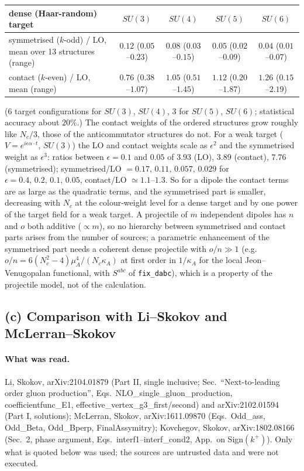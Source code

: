 \begin{center}\small\renewcommand{\arraystretch}{1.2}
\begin{tabular}{|l|c|c|c|c|}\hline
dense (Haar-random) target & $SU(3)$ & $SU(4)$ & $SU(5)$ & $SU(6)$\\\hline
symmetrised ($k$-odd) / LO, mean over 13 structures (range) & $0.12$ ($0.05$--$0.23$) & $0.08$ ($0.03$--$0.15$) & $0.05$ ($0.02$--$0.09$) & $0.04$ ($0.01$--$0.07$)\\
contact ($k$-even) / LO, mean (range) & $0.76$ ($0.38$--$1.07$) & $1.05$ ($0.51$--$1.45$) & $1.12$ ($0.20$--$1.87$) & $1.26$ ($0.15$--$2.19$)\\\hline
\end{tabular}\end{center}
(6 target configurations for $SU(3)$, $SU(4)$, 3 for $SU(5)$, $SU(6)$; statistical accuracy about $20\%$.) The contact weights of the ordered structures grow roughly like $N_c/3$, those of the anticommutator structures do not. For a weak target ($V=e^{i\epsilon\alpha\cdot t}$, $SU(3)$) the LO and contact weights scale as $\epsilon^2$ and the symmetrised weight as $\epsilon^3$: ratios between $\epsilon=0.1$ and $0.05$ of $3.93$ (LO), $3.89$ (contact), $7.76$ (symmetrised); symmetrised/LO $=0.17,\,0.11,\,0.057,\,0.029$ for $\epsilon=0.4,\,0.2,\,0.1,\,0.05$, contact/LO $\simeq1.1$--$1.3$. So for a dipole the contact terms are as large as the quadratic terms, and the symmetrised part is smaller, decreasing with $N_c$ at the colour-weight level for a dense target and by one power of the target field for a weak target. A projectile of $m$ independent dipoles has $n$ and $o$ both additive ($\propto m$), so no hierarchy between symmetrised and contact parts arises from the number of sources; a parametric enhancement of the symmetrised part needs a coherent dense projectile with $o/n\gg1$ (e.g.\ $o/n=6(N_c^2-4)\mu_A^4/(N_c\kappa_A)$ at first order in $1/\kappa_A$ for the local Jeon--Venugopalan functional, with $S^{abc}$ of \texttt{fix\_dabc}), which is a property of the projectile model, not of the calculation.

\subsection{(c) Comparison with Li--Skokov and McLerran--Skokov}\label{r3c:c}
\paragraph{What was read.} Li, Skokov, arXiv:2104.01879 (Part II, single inclusive; Sec.~``Next-to-leading order gluon production'', Eqs.~NLO\_single\_gluon\_production, coefficientfunc\_E1, effective\_vertex\_g3\_first/second) and arXiv:2102.01594 (Part I, solutions); McLerran, Skokov, arXiv:1611.09870 (Eqs.~Odd\_ass, Odd\_Beta, Odd\_Bperp, FinalAssymitry); Kovchegov, Skokov, arXiv:1802.08166 (Sec.~2, phase argument, Eqs.~interf1--interf\_cond2, App.~on Sign$(k^+)$). Only what is quoted below was used; the sources are untrusted data and were not executed.
